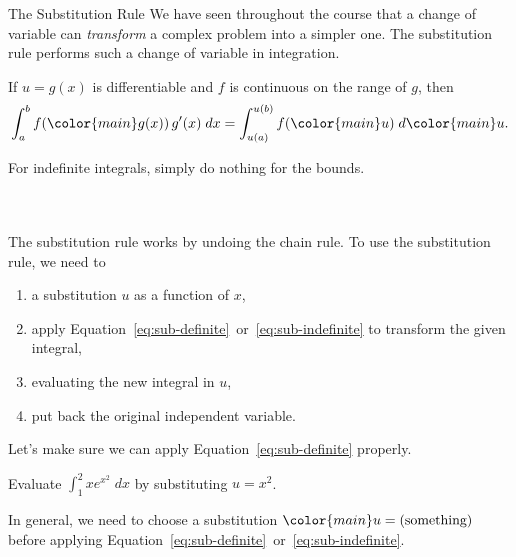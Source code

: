 \documentclass[../main.tex]{subfiles}
\begin{document}
\begin{lesson}{The Substitution Rule}
  We have seen throughout the course that a change of variable can \emph{transform} a complex problem into a simpler one. The substitution rule performs such a change of variable in integration.
  \begin{mdframed}[style=withref]
    {If {\color{main} \(u = g(x)\)} is differentiable and \(f\) is continuous on the range of \(g\), then}
    \begin{equation} \label{eq:sub-definite}
      \int_{a}^{b} f( {\color{main} g(x)} ) \, g'(x) \;dx = \int_{u(a)}^{u(b)} f({\color{main} u}) \;d {\color{main} u}.
    \end{equation}

    For indefinite integrals, simply do nothing for the bounds. 
    \begin{equation} \label{eq:sub-indefinite}
      \phantom{\int f( {\color{main} g(x)} ) \, g'(x) \;dx = \int f(u) \;du}
    \end{equation}

  \end{mdframed}
  The substitution rule works by undoing the chain rule. To use the substitution rule, we need to 
  \begin{enumerate}
    \item \underline{\hspace{1in}} a substitution $u$ as a function of $x$, \hfill{} 
    \item apply Equation~\eqref{eq:sub-definite}~or~\eqref{eq:sub-indefinite} to transform the given integral, \hfill{} 
    \item evaluating the new integral in $u$, \hfill{} 
    \item put back the original independent variable.
  \end{enumerate}

  \medskip
  Let's make sure we can apply Equation~\eqref{eq:sub-definite} properly.
  \begin{example} \label{ex:u-sub-2}
    Evaluate \(\int_{1}^{2} x e^{x^{2}} \;dx\) by substituting \(u = x^{2}\).
  \end{example}
  \clearpage

  In general, we need to choose a substitution \(\color{main} u = (\text{something})\) before applying Equation~\eqref{eq:sub-definite}~or~\eqref{eq:sub-indefinite}.


\end{lesson}
\end{document}
